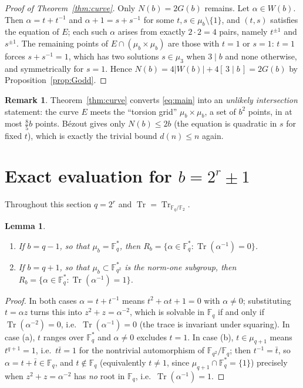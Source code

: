 \documentclass[a4paper]{article}
\newtheorem{lemma}[theorem]{Lemma}
\theoremstyle{definition}
\newtheorem{remark}[theorem]{Remark}
\newcommand{\F}{\mathbb{F}}
\newcommand{\abs}[1]{\left| #1 \right|}
\newcommand{\Tr}{\operatorname{Tr}}
\begin{document}
	\begin{proof}[Proof of Theorem~\ref{thm:curve}]
		Only $N(b) = 2G(b)$ remains.
		Let $\alpha \in W(b)$.
		Then $\alpha = t + t^{-1}$ and $\alpha + 1 = s + s^{-1}$ for some $t, s \in \mu_b \setminus \{1\}$, and $(t,s)$ satisfies the equation of $E$; each such $\alpha$ arises from exactly $2 \cdot 2 = 4$ pairs, namely $t^{\pm 1}$ and $s^{\pm 1}$.
		The remaining points of $E \cap (\mu_b\times\mu_b)$ are those with $t = 1$ or $s = 1$: $t = 1$ forces $s + s^{-1} = 1$, which has two solutions $s \in \mu_3$ when $3 \mid b$ and none otherwise, and symmetrically for $s = 1$.
		Hence $N(b) = 4\abs{W(b)} + 4[\,3\mid b\,] = 2 G(b)$ by Proposition~\ref{prop:Godd}.
	\end{proof}

	\begin{remark}
		Theorem~\ref{thm:curve} converts \eqref{eq:main} into an \emph{unlikely intersection} statement: the curve $E$ meets the ``torsion grid'' $\mu_b \times \mu_b$, a set of $b^2$ points, in at most $\frac{8}{5}b$ points.
		Bézout gives only $N(b) \le 2b$ (the equation is quadratic in $s$ for fixed $t$), which is exactly the trivial bound $d(n) \leq n$ again.
	\end{remark}

	\section{Exact evaluation for $b = 2^r \pm 1$}\label{sec:kloos}
	Throughout this section $q = 2^r$ and $\Tr = \Tr_{\F_q/\F_2}$.

	\begin{lemma}\label{lem:traceR}
		\begin{enumerate}[label=(\alph*)]
			\item If $b = q - 1$, so that $\mu_b = \F_q^*$, then $R_b = \{\alpha \in \F_q^* : \Tr(\alpha^{-1}) = 0\}$.
			\item If $b = q + 1$, so that $\mu_b \subset \F_{q^2}^*$ is the norm-one subgroup, then $R_b = \{\alpha \in \F_q^* : \Tr(\alpha^{-1}) = 1\}$.
		\end{enumerate}
	\end{lemma}
	\begin{proof}
		In both cases $\alpha = t + t^{-1}$ means $t^2 + \alpha t + 1 = 0$ with $\alpha \neq 0$; substituting $t = \alpha z$ turns this into $z^2 + z = \alpha^{-2}$, which is solvable in $\F_q$ if and only if $\Tr(\alpha^{-2}) = 0$, i.e.\ $\Tr(\alpha^{-1}) = 0$ (the trace is invariant under squaring).
		In case (a), $t$ ranges over $\F_q^*$ and $\alpha \ne 0$ excludes $t = 1$.
		In case (b), $t \in \mu_{q+1}$ means $t^{q+1} = 1$, i.e.\ $t \bar t = 1$ for the nontrivial automorphism of $\F_{q^2}/\F_q$; then $t^{-1} = \bar t$, so $\alpha = t + \bar t \in \F_q$, and $t \notin \F_q$ (equivalently $t \ne 1$, since $\mu_{q+1} \cap \F_q^* = \{1\}$) precisely when $z^2 + z = \alpha^{-2}$ has \emph{no} root in $\F_q$, i.e.\ $\Tr(\alpha^{-1}) = 1$.
	\end{proof}
\end{document}
